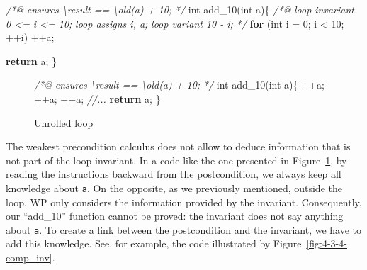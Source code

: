 \documentclass[12pt,francais,]{scrbook}
\newenvironment{Shaded}{}{}
\newcommand{\KeywordTok}[1]{\textcolor[rgb]{0.00,0.44,0.13}{\textbf{{#1}}}}
\newcommand{\DataTypeTok}[1]{\textcolor[rgb]{0.56,0.13,0.00}{{#1}}}
\newcommand{\DecValTok}[1]{\textcolor[rgb]{0.25,0.63,0.44}{{#1}}}
\newcommand{\CommentTok}[1]{\textcolor[rgb]{0.38,0.63,0.69}{\textit{{#1}}}}
\newcommand{\NormalTok}[1]{{#1}}
\begin{document}
\begin{footnotesize}\begin{Shaded}
\begin{Highlighting}[]
\CommentTok{/*@}
\CommentTok{    ensures \textbackslash{}result == \textbackslash{}old(a) + 10;}
\CommentTok{*/}
\DataTypeTok{int} \NormalTok{add_10(}\DataTypeTok{int} \NormalTok{a)\{}
    \CommentTok{/*@}
\CommentTok{        loop invariant 0 <= i <= 10;}
\CommentTok{        loop assigns i, a;}
\CommentTok{        loop variant 10 - i;}
\CommentTok{    */}
    \KeywordTok{for} \NormalTok{(}\DataTypeTok{int} \NormalTok{i = }\DecValTok{0}\NormalTok{; i < }\DecValTok{10}\NormalTok{; ++i)}
        \NormalTok{++a;}

    \KeywordTok{return} \NormalTok{a;}
\NormalTok{\}}
\end{Highlighting}
\end{Shaded}\end{footnotesize}

\begin{figure}
\begin{footnotesize}\begin{Shaded}
\begin{Highlighting}[]
\CommentTok{/*@}
\CommentTok{    ensures \textbackslash{}result == \textbackslash{}old(a) + 10;}
\CommentTok{*/}
\DataTypeTok{int} \NormalTok{add_10(}\DataTypeTok{int} \NormalTok{a)\{}
    \NormalTok{++a;}
    \NormalTok{++a;}
    \NormalTok{++a;}
    \CommentTok{//...}
    \KeywordTok{return} \NormalTok{a;}
\NormalTok{\}}
\end{Highlighting}
\end{Shaded}\end{footnotesize}
\caption{Unrolled loop}
\label{fig:4-3-4-unrolled}
\end{figure}

The weakest precondition calculus does not allow to deduce information
that is not part of the loop invariant. In a code like the one presented
in Figure~\ref{fig:4-3-4-unrolled}, by reading the instructions backward
from the postcondition, we always keep all knowledge about \texttt{a}. On
the opposite, as we previously mentioned, outside the loop, WP only
considers the information provided by the invariant. Consequently, our
``add\_10'' function cannot be proved: the invariant does not say anything
about \texttt{a}. To create a link between the postcondition and the
invariant, we have to add this knowledge. See, for example, the code
illustrated by Figure~\ref{fig:4-3-4-comp_inv}.
\end{document}
